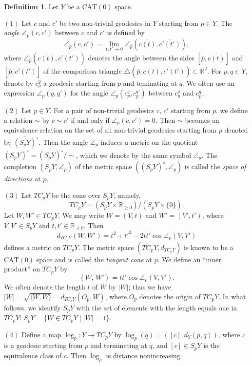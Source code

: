\documentclass[12pt]{amsart}
\numberwithin{equation}{section}
\theoremstyle{plain}
\theoremstyle{definition}
\newtheorem{Definition}[Theorem]{Definition}
\theoremstyle{remark}
\newcommand{\R}{{\mathbb R}}
\newcommand{\tcprj}{\log}
\newcommand{\inner}[2]{\left\langle #1,\, #2 \right\rangle}
\newcommand{\cat}[1]{\mathrm{CAT}(#1)}
\newcommand{\cc}[2]{c_{#1}^{#2}}
\newcommand{\tri}[3]{\triangle(#1,#2,#3)}
\begin{document}
%
%
\begin{Definition}
\label{tangent cone}
Let $Y$ be a $\cat{0}$ space.  

$(1)$  Let $c$ and $c'$ be two non-trivial geodesics in $Y$ starting 
from $p \in Y$. The {\it angle} $\angle_p(c,c')$ between $c$ and $c'$ 
is defined by 
\begin{equation*}
 \angle_p(c,c')= \lim_{t,t' \rightarrow 0}
 \angle_{\overline{p}}(\overline{c(t)},\overline{c'(t')}),
\end{equation*}
 where
 $\angle_{\overline{p}}(\overline{c(t)},\overline{c'(t')})$ 
 denotes the angle between the sides
 $[\overline{p},\overline{c(t)}]$ and $[\overline{p},\overline{c'(t')}]$
 of the comparison triangle
 $\tri{\overline{p}}{\overline{c(t)}}{\overline{c'(t')}}\subset\R^2$.
 For $p,q \in Y$, denote by $\cc{p}{q}$ a geodesic starting from $p$ and
 teminating at $q$. 
 We often use an expression $\angle_p(q,q')$ for the angle 
 $\angle_p(\cc{p}{q},\cc{p}{q'})$ between $\cc{p}{q}$ and $\cc{p}{q'}$. 

$(2)$  Let $p \in Y$.
 For a pair of non-trivial geodesics $c$, $c'$ starting from $p$, we 
 define a relation $\sim$ by $c\sim c'$ if and only if 
 $\angle_p(c,c')=0$. 
 Then $\sim$ becomes an equivalence relation on the set of
 all non-trivial geodesics starting from $p$ denoted by 
 $\widetilde{(S_pY)^{\circ}}$. 
 Then the angle $\angle_p$ induces a metric on the quotient 
 $(S_pY)^{\circ} = \widetilde{(S_pY)^{\circ}}/\sim$, 
 which we denote by the same symbol $\angle_p$.  The completion 
 $(S_pY,\angle_p)$ of the metric space $((S_pY)^{\circ}, \angle_p)$ is
 called the {\it space of directions}  at $p$.

$(3)$ Let $TC_pY$ be the cone over $S_pY$, namely,
\begin{equation*}
 TC_pY = (S_pY \times \R_{\geq 0}) / (S_pY \times \{0\}). 
\end{equation*}
 Let $W,W' \in TC_pY$. We may write $W=(V,t)$ and $W'=(V',t')$, where
 $V,V' \in S_pY$ and $t,t' \in \R_{\geq 0}$.   Then
\begin{equation*}
 d_{TC_pY}(W, W')= t^2 + {t'}^2 - 2tt'\cos \angle_p(V,V')
\end{equation*}
 defines a metric on $TC_pY$. The metric space $(TC_pY, d_{TC_pY})$ is
 known to be a $\cat{0}$ space and is called the {\it tangent cone} at
 $p$.
 We define an ``inner product''  on  $TC_pY$ by
\begin{equation*}
 \inner{W}{W'} = tt'\cos \angle_p(V,V').
\end{equation*}
 We often denote the length $t$ of $W$ by $|W|$; thus we have
 $|W|=\sqrt{\langle W,W \rangle}=d_{TC_pY}(O_p,W)$, where $O_p$ denotes
 the origin of $TC_pY$.   
 In what follows, we identify $S_pY$ with the set of elements
 with the length equals one in $TC_pY$: 
 $S_pY = \{W \in TC_pY \mid |W|=1\}$. 

$(4)$ Define a map $\tcprj_p \colon Y \longrightarrow TC_pY$ by
 $\tcprj_p(q)=([c], d_Y(p,q))$, where $c$ is a geodesic starting from
 $p$ and terminating at $q$, and $[c]\in S_pY$ is the equivalence class
 of $c$. Then $\tcprj_p$ is distance nonincreasing.  
\end{Definition}
\end{document}
